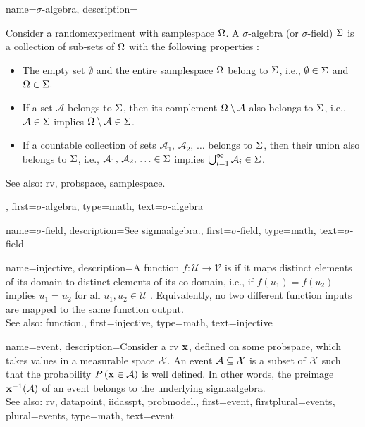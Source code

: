{name={$\sigma$-algebra}, 
	description={Consider a \gls{randomexperiment} with \gls{samplespace} $\Omega$. 
		A $\sigma$-algebra (or $\sigma$-field) $\Sigma$ 
		is a collection of sub-sets of $\Omega$ with the following properties 
		\cite{RudinBook,BillingsleyProbMeasure,durrett2010probability}:
		 \begin{itemize}
		 	\item The empty set $\emptyset$ and the entire \gls{samplespace} 
		 	$\Omega$ belong to $\Sigma$, i.e., $\emptyset \in \Sigma$ and $\Omega \in \Sigma$.
		 	\item If a set $\mathcal{A}$ belongs to $\Sigma$, then its complement 
		 	$\Omega \setminus \mathcal{A}$ also belongs to $\Sigma$, i.e., 
		 	$\mathcal{A} \in \Sigma$ implies $\Omega \setminus \mathcal{A} \in \Sigma$.
		 	\item If a countable collection of sets $\mathcal{A}_1, \,\mathcal{A}_2, \,\ldots$ belongs 
			to $\Sigma$, 
		 	then their union also belongs to $\Sigma$, i.e.,
		 	$\mathcal{A}_1, \,\mathcal{A}_2, \,\ldots \in \Sigma$ implies 
		 	$\bigcup_{i=1}^{\infty} \mathcal{A}_i \in \Sigma$.	
		 \end{itemize}			 
		See also: \gls{rv}, \gls{probspace}, \gls{samplespace}.},
	first={$\sigma$-algebra},
	type=math, 
	text={$\sigma$-algebra} 
}

{name={$\sigma$-field}, 
	description={See \gls{sigmaalgebra}.}, 
	first={$\sigma$-field},
	type=math,
	text={$\sigma$-field} 
}


{name={injective}, 
	description={A \gls{function} $f: \mathcal{U} \rightarrow \mathcal{V}$ is 
	if it maps distinct elements of its \gls{domain} to distinct elements 
	of its \gls{co-domain}, 
    i.e., if $f(u_1) = f(u_2)$ implies $u_1 = u_2$ for all $u_1, u_2 \in \mathcal{U}$ 
        \cite{HalmosSet}. 
    Equivalently, no two different \gls{function} inputs are mapped to the same \gls{function} output.
				\\
		See also: \gls{function}.},
	first={injective},
	type=math,
	text={injective} 
}


{name={event}, 
	description={Consider a \gls{rv} ${\bf x}$, defined on some \gls{probspace}, 
		which takes values in a \gls{measurable} space $\mathcal{X}$. An 
		event $\mathcal{A} \subseteq \mathcal{X}$ is a subset of $\mathcal{X}$ 
		such that the \gls{probability} $P\left({\bf x} \in \mathcal{A}\right)$ is well 
		defined. In other words, the \gls{preimage} ${\bf x}^{-1}(\mathcal{A})$ 
		of an event belongs to the underlying \gls{sigmaalgebra}. 
				\\
		See also: \gls{rv}, \gls{datapoint}, \gls{iidasspt}, \gls{probmodel}.},
	first={event},
	firstplural={events},
	plural={events},
	type=math,
	text={event} 
}

